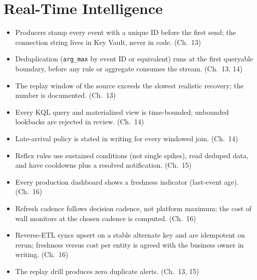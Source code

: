 \section{Real-Time Intelligence}
%
\begin{itemize}
    \item[$\square$] Producers stamp every event with a unique ID before the first send; the
    connection string lives in Key Vault, never in code. (Ch.~13)
    \item[$\square$] Deduplication (\texttt{arg\_max} by event ID or equivalent) runs at the
    first queryable boundary, before any rule or aggregate consumes the stream. (Ch.~13, 14)
    \item[$\square$] The replay window of the source exceeds the slowest realistic recovery;
    the number is documented. (Ch.~13)
    \item[$\square$] Every KQL query and materialized view is time-bounded; unbounded lookbacks
    are rejected in review. (Ch.~14)
    \item[$\square$] Late-arrival policy is stated in writing for every windowed join. (Ch.~14)
    \item[$\square$] Reflex rules use sustained conditions (not single spikes), read deduped
    data, and have cooldowns plus a resolved notification. (Ch.~15)
    \item[$\square$] Every production dashboard shows a freshness indicator (last-event age).
    (Ch.~16)
    \item[$\square$] Refresh cadence follows decision cadence, not platform maximum; the cost
    of wall monitors at the chosen cadence is computed. (Ch.~16)
    \item[$\square$] Reverse-ETL syncs upsert on a stable alternate key and are idempotent on
    rerun; freshness versus cost per entity is agreed with the business owner in writing. (Ch.~16)
    \item[$\square$] The replay drill produces zero duplicate alerts. (Ch.~13, 15)
\end{itemize}

